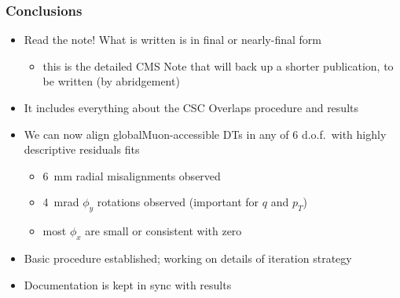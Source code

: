 \documentclass[compress]{beamer}
\begin{document}

\begin{frame}
\frametitle{Conclusions}
\begin{itemize}\setlength{\itemsep}{0.4 cm}
\item Read the note!  What is written is in final or nearly-final form
\begin{itemize}
\item this is the detailed CMS Note that will back up a shorter publication, to be written (by abridgement)
\end{itemize}
\item It includes everything about the CSC Overlaps procedure and results
\item We can now align globalMuon-accessible DTs in any of 6 d.o.f.\ with highly descriptive residuals fits
\begin{itemize}\setlength{\itemsep}{0.2 cm}
\item 6~mm radial misalignments observed
\item 4~mrad $\phi_y$ rotations observed (important for $q$ and $p_T$)
\item most $\phi_x$ are small or consistent with zero
\end{itemize}
\item Basic procedure established; working on details of iteration strategy
\item Documentation is kept in sync with results
\end{itemize}
\label{numpages}
\end{frame}
\end{document}
